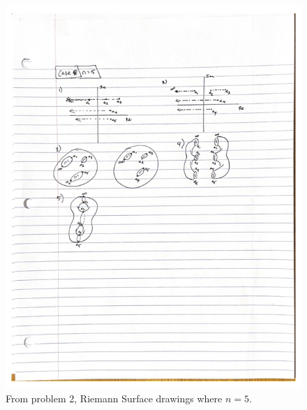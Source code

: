 \documentclass[10pt]{amsart}
\theoremstyle{nonumberplain}
\begin{document}
\begin{enumerate}[label={\bf {\arabic*}:}]
\begin{figure}[h]
	\centering
	\includegraphics[width=1\textwidth]{riemann_surface_5}
	\caption{
	From problem 2, Riemann Surface drawings where $n=5$.}\label{fig:f3}
\end{figure}


\end{enumerate}
\end{document}
